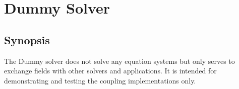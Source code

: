\chapter{Dummy Solver}

\section{Synopsis}
The Dummy solver does not solve any equation systems but only serves to exchange fields with other solvers and applications.
It is intended for demonstrating and testing the coupling implementations only.
